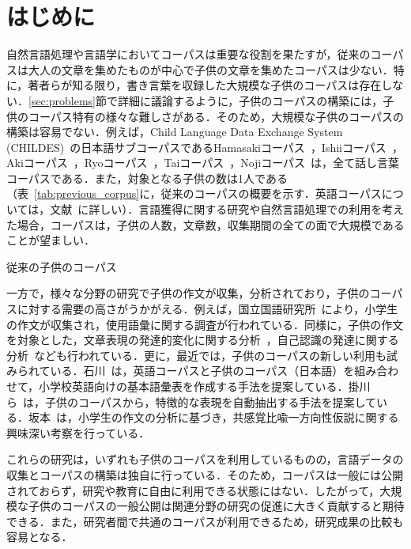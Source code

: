 \documentclass[japanese]{jnlp_1.4}
\begin{document}
\maketitle


\section{はじめに}\label{sec:intro}

自然言語処理や言語学においてコーパスは重要な役割を果たすが，従来のコーパスは大人の文章を集めたものが中心で子供の文章を集めたコーパスは少ない．特に，著者らが知る限り，書き言葉を収録した大規模な子供のコーパスは存在しない．\ref{sec:problems}節で詳細に議論するように，子供のコーパスの構築には，子供のコーパス特有の様々な難しさがある．そのため，大規模な子供のコーパスの構築は容易でない．例えば，Child Language Data Exchange System (CHILDES)~\cite{macwhinney1,macwhinney2}の日本語サブコーパスであるHamasakiコーパス~\cite{hamasaki}，Ishiiコーパス~\cite{macwhinney1,macwhinney2}，Akiコーパス~\cite{aki}，Ryoコーパス~\cite{ryo}，Taiコーパス~\cite{tai}，Nojiコーパス~\cite{macwhinney1,macwhinney2}は，全て話し言葉コーパスである．また，対象となる子供の数は1人である（表~\ref{tab:previous_corpus}に，従来のコーパスの概要を示す．英語コーパスについては，文献~\cite{chujo}に詳しい）．言語獲得に関する研究や自然言語処理での利用を考えた場合，コーパスは，子供の人数，文章数，収集期間の全ての面で大規模であることが望ましい．
  

\begin{table}[b]
\caption{従来の子供のコーパス}
\label{tab:previous_corpus}

\end{table}


  一方で，様々な分野の研究で子供の作文が収集，分析されており，子供のコーパスに対する需要の高さがうかがえる．例えば，国立国語研究所~\cite{kokken}により，小学生の作文が収集され，使用語彙に関する調査が行われている．同様に，子供の作文を対象とした，文章表現の発達的変化に関する分析~\cite{ishida}，自己認識の発達に関する分析~\cite{moriya}なども行われている．更に，最近では，子供のコーパスの新しい利用も試みられている．石川~\cite{ishikawa}は，英語コーパスと子供のコーパス（日本語）を組み合わせて，小学校英語向けの基本語彙表を作成する手法を提案している．掛川ら~\cite{kakegawa}は，子供のコーパスから，特徴的な表現を自動抽出する手法を提案している．坂本~\cite{sakamoto}は，小学生の作文の分析に基づき，共感覚比喩一方向性仮説に関する興味深い考察を行っている．


  これらの研究は，いずれも子供のコーパスを利用しているものの，言語データの収集とコーパスの構築は独自に行っている．そのため，コーパスは一般には公開されておらず，研究や教育に自由に利用できる状態にはない．したがって，大規模な子供のコーパスの一般公開は関連分野の研究の促進に大きく貢献すると期待できる．また，研究者間で共通のコーパスが利用できるため，研究成果の比較も容易となる．
\end{document}
